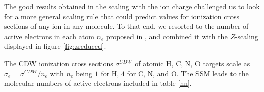 \documentclass[10pt,showpacs,showkeys,twocolumn]{revtex4}
\begin{document}
The good results obtained in the scaling with the ion charge challenged us to look for a more general scaling rule that could predict values for ionization cross sections of any ion in any molecule.  %
To that end, we resorted to the %
number of active electrons in each atom $n_e$ proposed in \cite{MendezJPB20}, and combined it with the $Z$-scaling displayed in figure \ref{fig:zreduced}. %

The CDW ionization cross sections $\sigma^{CDW}$ of atomic H, C, N, O targets scale as $\sigma_e=\sigma^{CDW}/n_e$ with  $n_e$ being $1$ for H, $4$ for C, N, and O. %
The SSM leads to the molecular numbers of active electrons included in table \ref{nn}.
\end{document}
